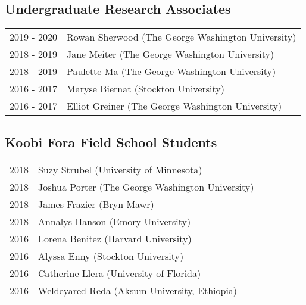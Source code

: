 \documentclass{article}
\begin{document}
\subsection*{Undergraduate Research Associates}
\begin{tabular}{p{}p{}}
2019 - 2020 & Rowan Sherwood (The George Washington University)\\[4pt]
2018 - 2019 & Jane Meiter (The George Washington University)\\[4pt]
2018 - 2019 & Paulette Ma (The George Washington University)\\[4pt]
2016 - 2017 & Maryse Biernat (Stockton University)\\[4pt]
2016 - 2017 & Elliot Greiner (The George Washington University)\\
\end{tabular} 

\subsection*{Koobi Fora Field School Students}
\begin{tabular}{p{}p{}}
2018 & Suzy Strubel (University of Minnesota)\\[4pt]
2018 & Joshua Porter (The George Washington University)\\[4pt]
2018 & James Frazier (Bryn Mawr)\\[4pt] 
2018 & Annalys Hanson (Emory University)\\[4pt]
2016 & Lorena Benitez (Harvard University)\\[4pt]
2016 & Alyssa Enny (Stockton University)\\[4pt]
2016 & Catherine Llera (University of Florida)\\[4pt]
2016 & Weldeyared Reda (Aksum University, Ethiopia)\\
\end{tabular}

 
\end{document}

